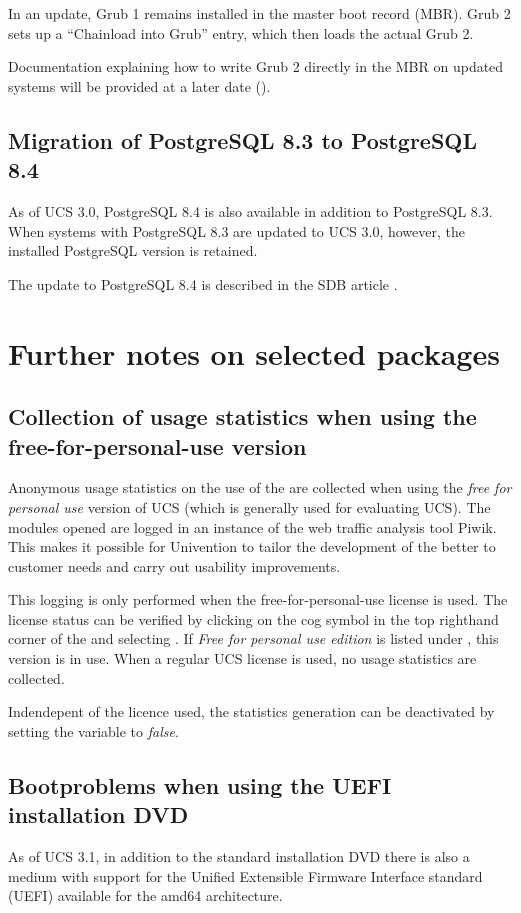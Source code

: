 In an update, Grub 1 remains installed in the master boot record
(MBR). Grub 2 sets up a ``Chainload into Grub'' entry, which then
loads the actual Grub 2.

Documentation explaining how to write Grub 2 directly in the MBR on
updated systems will be provided at a later date ().

\section{Migration of PostgreSQL 8.3 to PostgreSQL 8.4}
As of UCS 3.0, PostgreSQL 8.4 is also available in addition to
PostgreSQL 8.3. When systems with PostgreSQL 8.3 are updated to UCS
3.0, however, the installed PostgreSQL version is retained.

The update to PostgreSQL 8.4 is described in the SDB
article .


\chapter{Further notes on selected packages}

\section{Collection of usage statistics when using the free-for-personal-use version}

Anonymous usage statistics on the use of the \ucsUMC{} are collected when using the \emph{free for
personal use} version of UCS (which is generally used for evaluating UCS). The modules
opened are logged in an instance of the web traffic analysis tool Piwik. This makes it
possible for Univention to tailor the development of the \ucsUMC{} better to customer needs
and carry out usability improvements.

This logging is only performed when the free-for-personal-use license
is used. The license status can be verified by clicking on the cog
symbol in the top righthand corner of the \ucsUMC{} and
selecting . If \emph{Free for personal use
edition} is listed under , this version is in
use. When a regular UCS license is used, no usage statistics are
collected.

Indendepent of the licence used, the statistics generation can be
deactivated by setting the \ucsUCR{} variable  to \emph{false}.

\section{Bootproblems when using the UEFI installation DVD}
As of UCS 3.1, in addition to the standard installation DVD there is
also a medium with support for the Unified Extensible Firmware
Interface standard (UEFI) available for the amd64 architecture.


